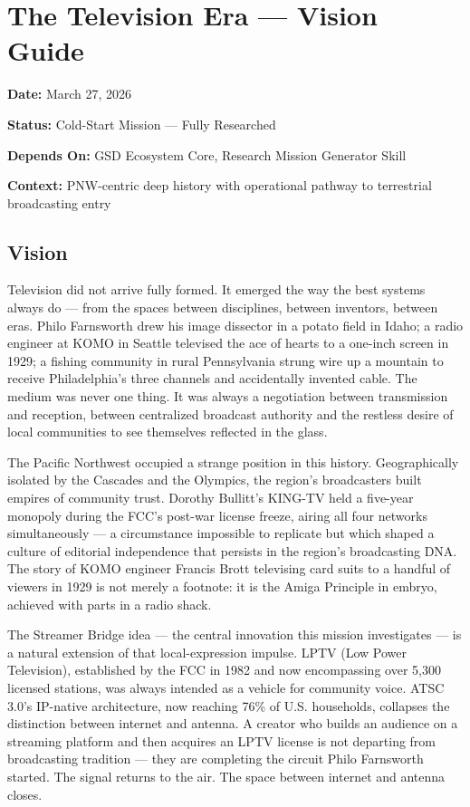 \documentclass[11pt,letterpaper]{article}
\newcommand{\metafield}[2]{\textbf{\sffamily #1} #2\par}
\begin{document}
\section{The Television Era --- Vision Guide}

\metafield{Date:}{March 27, 2026}
\metafield{Status:}{Cold-Start Mission --- Fully Researched}
\metafield{Depends On:}{GSD Ecosystem Core, Research Mission Generator Skill}
\metafield{Context:}{PNW-centric deep history with operational pathway to terrestrial broadcasting entry}

\subsection{Vision}

Television did not arrive fully formed. It emerged the way the best systems always do --- from the spaces between disciplines, between inventors, between eras. Philo Farnsworth drew his image dissector in a potato field in Idaho; a radio engineer at KOMO in Seattle televised the ace of hearts to a one-inch screen in 1929; a fishing community in rural Pennsylvania strung wire up a mountain to receive Philadelphia's three channels and accidentally invented cable. The medium was never one thing. It was always a negotiation between transmission and reception, between centralized broadcast authority and the restless desire of local communities to see themselves reflected in the glass.

The Pacific Northwest occupied a strange position in this history. Geographically isolated by the Cascades and the Olympics, the region's broadcasters built empires of community trust. Dorothy Bullitt's KING-TV held a five-year monopoly during the FCC's post-war license freeze, airing all four networks simultaneously --- a circumstance impossible to replicate but which shaped a culture of editorial independence that persists in the region's broadcasting DNA. The story of KOMO engineer Francis Brott televising card suits to a handful of viewers in 1929 is not merely a footnote: it is the Amiga Principle in embryo, achieved with parts in a radio shack.

The Streamer Bridge idea --- the central innovation this mission investigates --- is a natural extension of that local-expression impulse. LPTV (Low Power Television), established by the FCC in 1982 and now encompassing over 5,300 licensed stations, was always intended as a vehicle for community voice. ATSC 3.0's IP-native architecture, now reaching 76\% of U.S. households, collapses the distinction between internet and antenna. A creator who builds an audience on a streaming platform and then acquires an LPTV license is not departing from broadcasting tradition --- they are completing the circuit Philo Farnsworth started. The signal returns to the air. The space between internet and antenna closes.
\end{document}
